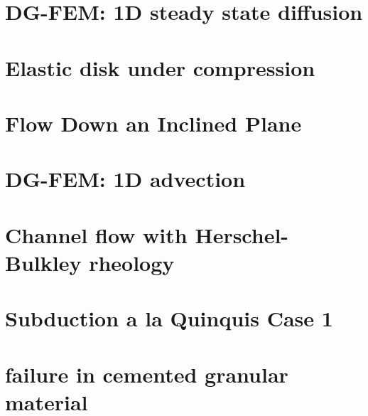 \documentclass[a4paper,11pt]{report}
\begin{document}
\chapter{DG-FEM: 1D steady state diffusion \label{f57}} %

\chapter{Elastic disk under compression \label{f58}} %

\chapter{Flow Down an Inclined Plane \label{f59}} %

\chapter{DG-FEM: 1D advection \label{f60}} %

\chapter{Channel flow with Herschel-Bulkley rheology \label{f61}} %

\chapter{Subduction a la Quinquis Case 1 \label{f62}} %

\chapter{failure in cemented granular material \label{f63}} %
\end{document}
